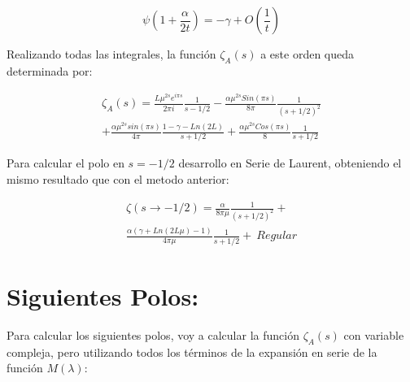 \begin{equation}
    \psi(1 + \frac{\alpha}{2 t}) =
    - \gamma + O \left( \frac{1}{t} \right)
\end{equation}

Realizando todas las integrales, la función $ \zeta _A (s)$ a este orden queda determinada por:  

\begin{equation}
\begin{array}{c}
    \zeta _A (s)  = 
    \frac{L \mu ^{2 s} e ^{i \pi s}}{2 \pi i} \frac{1}{s-1/2} 
    -\frac{\alpha \mu ^{2s} Sin(\pi s)}{8 \pi} \frac{1}{(s+1/2) ^2} \\
    + \frac{\alpha \mu ^{2s} sin (\pi s) }{4 \pi } \frac{1 - \gamma -  Ln(2 L)}{s+1/2}
    + \frac{\alpha \mu ^{2s} Cos(\pi s)}{8} \frac{1}{s+1/2}
    
\end{array}
\end{equation}



Para calcular el polo en $s=-1/2$ desarrollo en Serie de Laurent, obteniendo el mismo resultado que con el metodo anterior:

\begin{equation}
\begin{array}{c}

	\zeta (s \rightarrow -1/2) = 
    \frac{\alpha}{8 \pi \mu } \frac{1}{(s+1/2)^2} + \\
	\frac{\alpha ( \gamma  + Ln(2L \mu ) -1 )}{4 \pi \mu } \frac{1}{s+1/2} + \ Regular
    
\end{array}
\label{eq.desarrollo}
\end{equation}



\section{Siguientes Polos:} 

Para calcular los siguientes polos, voy a calcular la función $\zeta _A (s) $ con variable compleja, pero utilizando todos los términos de la expansión en serie de la función $M ( \lambda )$:

